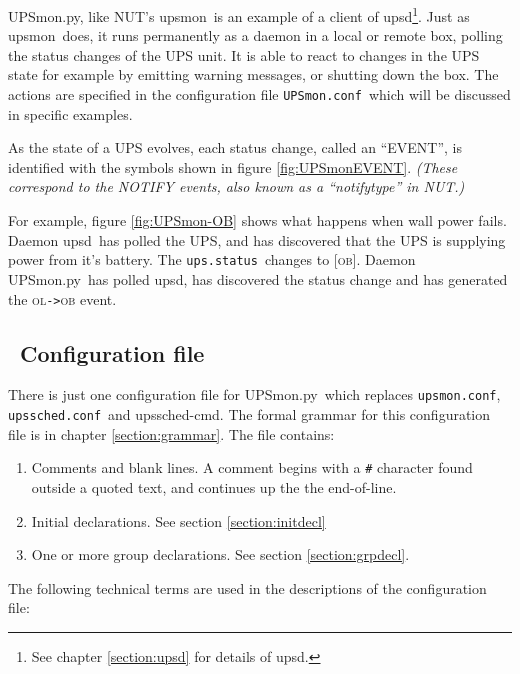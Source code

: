 \documentclass[12pt]{article}
\newlength{\headersep}\setlength{\headersep}{3mm}
\newcommand{\Hsep}{\hspace{\headersep}}
\newcommand{\upsd}{\mbox{\textcolor{UPSDCOLOUR}{upsd}}}
\newcommand{\upsmon}{\mbox{\textcolor{MONCOLOUR}{upsmon}}}
\newcommand{\upsschedcmd}{\mbox{\textcolor{CMDCOLOUR}{upssched-cmd}}}
\newcommand{\UPSmon}{\mbox{\textcolor{UPSMONCOLOUR}{UPSmon.py}}}
\newcommand{\OB}{\textcolor{UPSDCOLOUR}{\textsc{ob}}}
\newcommand{\OL}{\textcolor{UPSDCOLOUR}{\textsc{ol}}}
\newcommand{\status}[1]{\textcolor{UPSDCOLOUR}{[{#1}]}}
\newcommand{\EVENT}[2]{\textcolor{MONCOLOUR}{#1}{\allowbreak}\texttt{\textcolor{MONCOLOUR}{->}}{\allowbreak}\textcolor{MONCOLOUR}{#2}}
\newcommand{\upsmonconf}{\textcolor{MONCOLOUR}{\texttt{upsmon.conf}}}
\newcommand{\upsschedconf}{\textcolor{SCHEDCOLOUR}{\texttt{upssched.conf}}}
\newcommand{\UPSmonconf}{\textcolor{UPSMONCOLOUR}{\texttt{UPSmon.conf}}}
\newcommand{\upsstatus}{\textcolor{UPSDCOLOUR}{\texttt{ups{\allowbreak}.status}}}
\newcommand{\ol}{\begin{enumerate}%
   \setlength{\itemsep}{0em}}
\newcommand{\eol}{\end{enumerate}}
\newcommand{\li}{\item}                 %
\begin{document}
\UPSmon, like NUT's \upsmon\ is an example of a client of \upsd\footnote{See
  chapter \ref{section:upsd} for details of \upsd.}.  Just as \upsmon\ does,
it runs permanently as a daemon in a local or remote box, polling the status
changes of the UPS unit.  It is able to react to changes in the UPS state for
example by emitting warning messages, or shutting down the box.  The actions
are specified in the configuration file \UPSmonconf\ which will be discussed
in specific examples.

As the state of a UPS evolves, each status change, called an ``EVENT'', is
identified with the symbols shown in figure \ref{fig:UPSmonEVENT}.
\textit{(These correspond to the NOTIFY events, also known as a ``notifytype''
  in NUT.)}

For example, figure \ref{fig:UPSmon-OB} shows what happens when wall power
fails.  Daemon \upsd\ has polled the UPS, and has discovered that the UPS is
supplying power from it's battery.  The \upsstatus\ changes to \status{\OB}.
Daemon \UPSmon\ has polled \upsd, has discovered the status change and has
generated the \EVENT{\OL}{\OB} event.


\subsection{\Hsep\ Configuration file}\label{section:UPSmonconffile}

There is just one configuration file for \UPSmon\ which replaces \upsmonconf,
\upsschedconf\ and \upsschedcmd.  The formal grammar for this configuration
file is in chapter \ref{section:grammar}.  The file contains:

\ol

\li Comments and blank lines.  A comment begins with a \texttt{\#} character
found outside a quoted text, and continues up the the end-of-line.

\li Initial declarations.  See section \ref{section:initdecl}

\li One or more group declarations.  See section \ref{section:grpdecl}.

\eol

The following technical terms are used in the descriptions of the
configuration file:
\end{document}
